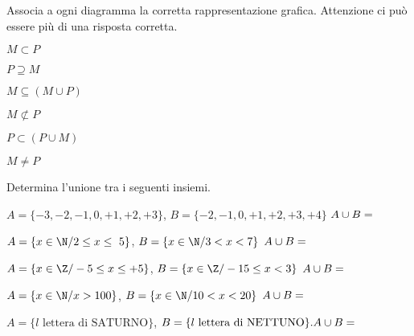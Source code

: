\begin{esercizio}
\label{ese:7.44}
Associa a ogni diagramma la corretta rappresentazione grafica. Attenzione ci 
può 
essere più di una risposta corretta.
\begin{multicols}{2}
\begin{enumeratea}
 \item \(M\subset P\) \hfill\boxA\quad\boxB\quad\boxC\quad\boxD\quad\boxE
\item \(P\supseteq M\) \hfill\boxA\quad\boxB\quad\boxC\quad\boxD\quad\boxE
\item \(M\subseteq (M\cup P)\) 
\hfill\boxA\quad\boxB\quad\boxC\quad\boxD\quad\boxE
\item \(M\not\subset P\) \hfill\boxA\quad\boxB\quad\boxC\quad\boxD\quad\boxE
\item \(P\subset (P\cup M)\) 
\hfill\boxA\quad\boxB\quad\boxC\quad\boxD\quad\boxE
\item \(M\neq P\) \hfill\boxA\quad\boxB\quad\boxC\quad\boxD\quad\boxE
\end{enumeratea}
\end{multicols}
\begin{center}

\end{center}
\end{esercizio}

\newpage %

\begin{esercizio}
\label{ese:7.45}
Determina l'unione tra i seguenti insiemi.

\begin{enumeratea}
 \item \(A=\{-3,-2,-1,0,+1,+2,+3\}\), \(B=\{-2,-1,0,+1,+2,+3,+4\}\) \(A\cup 
B=\dotfill\)
 \item \(A=\{x\in\N/2\le x\le~5\}\), \(B=\{x\in\N/3<x<7\}\) \(A\cup 
B=\dotfill\)
 \item \(A=\{x\in\Z/-5\le x\le +5\}\), \(B=\{x\in\Z/-15\le x<3\}\) 
\(A\cup 
B=\dotfill\)
 \item \(A=\{x\in\N/x>100\}\), \(B=\{x\in \N/10<x<20\}\) \(A\cup B=\dotfill\)
 \item \(A=\{l\text{ lettera di SATURNO}\}\), \(B=\{l\text{ lettera di 
NETTUNO}\}. 
A\cup B=\dotfill\)
\end{enumeratea}
\end{esercizio}

